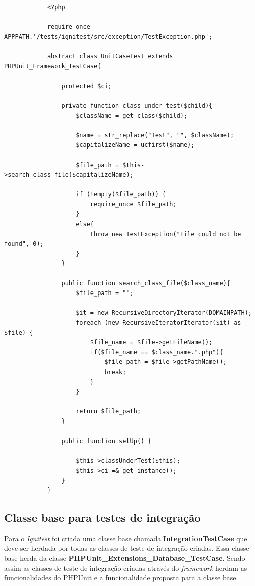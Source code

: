         \begin{lstlisting}
            <?php

            require_once APPPATH.'/tests/ignitest/src/exception/TestException.php';

            abstract class UnitCaseTest extends PHPUnit_Framework_TestCase{

                protected $ci;

                private function class_under_test($child){
                    $className = get_class($child);

                    $name = str_replace("Test", "", $className);
                    $capitalizeName = ucfirst($name);

                    $file_path = $this->search_class_file($capitalizeName);

                    if (!empty($file_path)) {
                        require_once $file_path;
                    }
                    else{
                        throw new TestException("File could not be found", 0);
                    }
                }

                public function search_class_file($class_name){
                    $file_path = "";

                    $it = new RecursiveDirectoryIterator(DOMAINPATH);
                    foreach (new RecursiveIteratorIterator($it) as $file) {
                        $file_name = $file->getFileName();
                        if($file_name == $class_name.".php"){
                            $file_path = $file->getPathName();
                            break; 
                        }
                    }

                    return $file_path;
                }
                
                public function setUp() {   

                    $this->classUnderTest($this);
                    $this->ci =& get_instance();
                }
            }

        \end{lstlisting}

    \subsection{Classe base para testes de integração}

        Para o \textit{Ignitest} foi criada uma classe base chamada \textbf{IntegrationTestCase} que deve ser herdada por todas as classes de teste de integração criadas. 
        Essa classe base herda da classe \textbf{PHPUnit\_Extensions\_Database\_TestCase}. Sendo assim as classes de teste de integração criadas através do \textit{framework} herdam as funcionalidades do PHPUnit e a funcionalidade proposta para a classe base.

